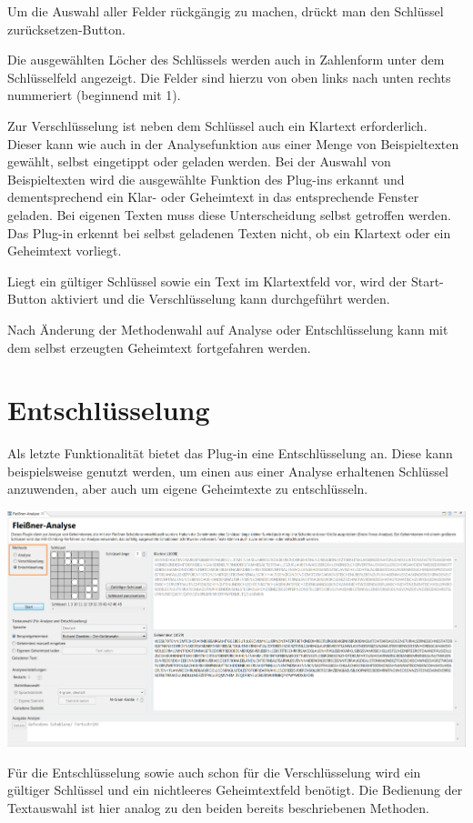 \documentclass[fontsize=12pt, DIV=15, parskip=half-]{scrartcl}
\theoremstyle{break}
\begin{document}
Um die Auswahl aller Felder rückgängig zu machen, drückt man den \glqq Schlüssel zurücksetzen\grqq -Button.

Die ausgewählten Löcher des Schlüssels werden auch in Zahlenform unter dem Schlüsselfeld angezeigt. Die Felder sind hierzu von oben links nach unten rechts nummeriert (beginnend mit 1).


Zur Verschlüsselung ist neben dem Schlüssel auch ein Klartext erforderlich. Dieser kann wie auch in der Analysefunktion aus einer Menge von Beispieltexten gewählt, selbst eingetippt oder geladen werden. Bei der Auswahl von Beispieltexten wird die ausgewählte Funktion des Plug-ins erkannt und dementsprechend ein Klar- oder Geheimtext in das entsprechende Fenster geladen. Bei eigenen Texten muss diese Unterscheidung selbst getroffen werden. Das Plug-in erkennt bei selbst geladenen Texten nicht, ob ein Klartext oder ein Geheimtext vorliegt.

Liegt ein gültiger Schlüssel sowie ein Text im Klartextfeld vor, wird der \glqq Start\grqq -Button aktiviert und die Verschlüsselung kann durchgeführt werden. 

Nach Änderung der Methodenwahl auf \glqq Analyse\grqq{} oder \glqq Entschlüsselung\grqq{} kann mit dem selbst erzeugten Geheimtext fortgefahren werden.

\section{Entschlüsselung}\hypertarget{entschl}{}

Als letzte Funktionalität bietet das Plug-in eine Entschlüsselung an. Diese kann beispielsweise genutzt werden, um einen aus einer Analyse erhaltenen Schlüssel anzuwenden, aber auch um eigene Geheimtexte zu entschlüsseln. 

\includegraphics[scale=0.45]{FleissnerDecrypt.png}

Für die Entschlüsselung sowie auch schon für die Verschlüsselung wird ein gültiger Schlüssel und ein nichtleeres Geheimtextfeld benötigt. Die Bedienung der Textauswahl ist hier analog zu den beiden bereits beschriebenen Methoden.
\end{document}
